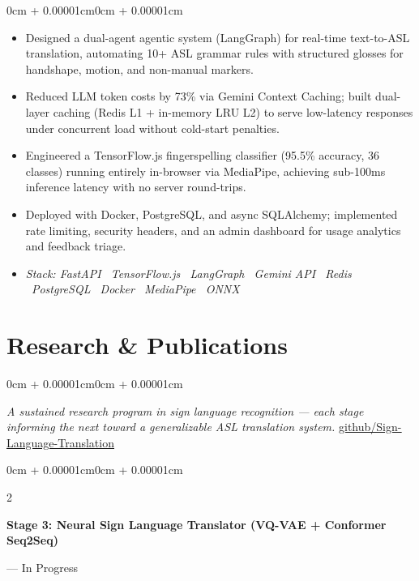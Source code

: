 \documentclass[10pt, letterpaper]{article}
\newenvironment{highlights}{
    \begin{itemize}[
        topsep=0.08cm, parsep=0.08cm,
        partopsep=0pt, itemsep=0pt,
        leftmargin=0cm + 10pt
    ]
}{\end{itemize}}
\newenvironment{onecolentry}{
    \begin{adjustwidth}{0cm + 0.00001cm}{0cm + 0.00001cm}
}{\end{adjustwidth}}
\newenvironment{twocolentry}[2][]{
    \onecolentry
    \def\secondColumn{#2}
    \setcolumnwidth{\fill, 4.5cm}
    \begin{paracol}{2}
}{
    \switchcolumn \raggedleft \secondColumn
    \end{paracol}
    \endonecolentry
}
\begin{document}
\vspace{0.08cm}
\begin{onecolentry}
    \begin{highlights}
        \item Designed a dual-agent agentic system (LangGraph) for real-time text-to-ASL translation, automating 10+ ASL grammar rules with structured glosses for handshape, motion, and non-manual markers.
        \item Reduced LLM token costs by 73\% via Gemini Context Caching; built dual-layer caching (Redis L1 + in-memory LRU L2) to serve low-latency responses under concurrent load without cold-start penalties.
        \item Engineered a TensorFlow.js fingerspelling classifier (95.5\% accuracy, 36 classes) running entirely in-browser via MediaPipe, achieving sub-100ms inference latency with no server round-trips.
        \item Deployed with Docker, PostgreSQL, and async SQLAlchemy; implemented rate limiting, security headers, and an admin dashboard for usage analytics and feedback triage.
        \item \textit{Stack: FastAPI \textbullet\ TensorFlow.js \textbullet\ LangGraph \textbullet\ Gemini API \textbullet\ Redis \textbullet\ PostgreSQL \textbullet\ Docker \textbullet\ MediaPipe \textbullet\ ONNX}
    \end{highlights}
\end{onecolentry}

\vspace{0.1cm}

\section{Research \& Publications}

\begin{onecolentry}
    \textit{\small A sustained research program in sign language recognition --- each stage informing the next toward a generalizable ASL translation system.} \hfill \href{https://github.com/shravnchandr/Sign-Language-Translation}{\underline{github/Sign-Language-Translation}}
\end{onecolentry}

\vspace{0.15cm}

\begin{twocolentry}{2026 --- In Progress}
    \textbf{Stage 3: Neural Sign Language Translator (VQ-VAE + Conformer Seq2Seq)}
\end{twocolentry}
\end{document}
